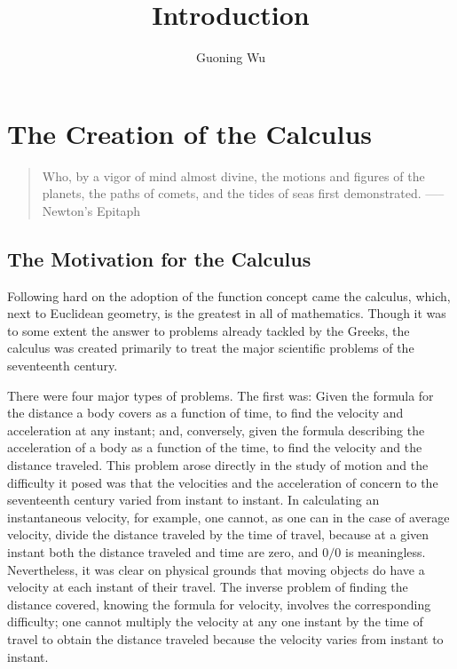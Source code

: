 \documentclass[a4paper,12pt]{article} %
\title{Introduction}
\author{Guoning Wu}
\begin{document}
\graphicspath{{../Figs/}}

\setcounter{tocdepth}{2}


\maketitle

\section{The Creation of the Calculus}
\begin{quote}
    {\color{red}Who, by a vigor of mind almost divine, the motions and figures 
    of the planets, the paths of comets, and the tides of seas first 
    demonstrated. -----Newton's Epitaph}
\end{quote}
\subsection{The Motivation for the Calculus}
Following hard on the adoption of the function concept came the 
calculus, which, next to Euclidean geometry, is the greatest 
in all of mathematics. Though it was to some extent the answer  
to problems already tackled by the Greeks, the calculus was 
created primarily to treat the major scientific problems of the 
seventeenth century.

There were four major types of problems. The first was: Given 
the formula for the distance a body covers as a function of time,
to find the velocity and acceleration at any instant; and, 
conversely, given the formula describing the acceleration of a 
body as a function of the time, to find the velocity and the 
distance traveled. This problem arose directly in the study of motion and the difficulty it posed was that the velocities and the acceleration of concern to the seventeenth century varied from instant to instant. In calculating an instantaneous velocity, for example, one cannot, as one can in the case of average velocity, divide the distance traveled by the time of travel, because at a given instant both the distance traveled and time are zero, and $0/0$ is meaningless. Nevertheless, it was clear on physical grounds that moving objects do have a velocity at each instant of their travel. The inverse problem of finding the distance covered, knowing the formula for velocity, involves the corresponding difficulty; one cannot multiply the velocity at any one instant by the time of travel to obtain the distance traveled because the velocity varies from instant to instant.
\end{document}
